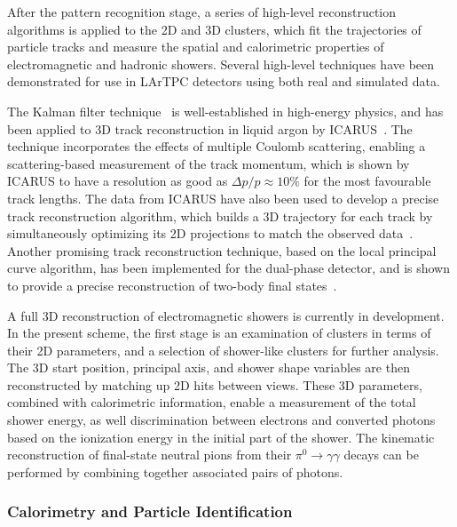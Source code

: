 After the pattern recognition stage, a series of high-level reconstruction
algorithms is applied to the 2D and 3D clusters,
which fit the trajectories of particle tracks and measure the
spatial and calorimetric properties of electromagnetic and hadronic showers.
Several high-level techniques have been demonstrated 
for use in LArTPC detectors using both real and simulated data.

The Kalman filter technique~\cite{kalman} is well-established in high-energy physics,
and has been applied to 3D track reconstruction in liquid argon by ICARUS~\cite{Ankowski:2006ts}.
The technique incorporates the effects of multiple Coulomb scattering,
enabling a scattering-based measurement of the track momentum,
which is shown by ICARUS to have a resolution as good as $\Delta p/p \approx 10\%$ 
for the most favourable track lengths.
The data from ICARUS have also been used to develop a precise
track reconstruction algorithm, which builds a 3D trajectory for each track by simultaneously
optimizing its 2D projections to match the observed data~\cite{Antonello:2012hu}.
Another promising track reconstruction technique, based on the local principal curve algorithm,
has been implemented for the dual-phase detector, and is shown to provide 
a precise reconstruction of two-body final states~\cite{Back:2013cva,LAGUNA-LBNO-deliv}. 

A full 3D reconstruction of electromagnetic showers is currently in development.
In the present scheme, the first stage is an examination of clusters 
in terms of their 2D parameters, and a selection of shower-like clusters 
for further analysis. The 3D start position, principal axis,
and shower shape variables are then reconstructed by matching up 2D hits between views.
These 3D parameters, combined with calorimetric information, enable a measurement
of the total shower energy, as well discrimination between electrons
and converted photons based on the ionization energy in the initial part of
the shower. The kinematic reconstruction of final-state neutral pions from their
$\pi^{0} \rightarrow \gamma\gamma$ decays can be performed by 
combining together associated pairs of photons.


\subsubsection{Calorimetry and Particle Identification}

